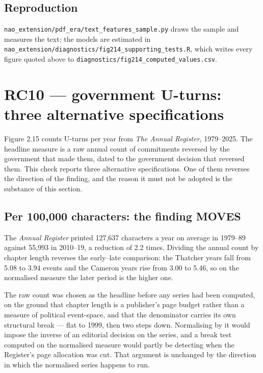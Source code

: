 \subsection*{Reproduction}

\texttt{nao\_extension/pdf\_era/text\_features\_sample.py} draws the sample and measures the
text; the models are estimated in
\texttt{nao\_extension/diagnostics/fig214\_supporting\_tests.R}, which writes every figure quoted
above to \texttt{diagnostics/fig214\_computed\_values.csv}.



\section{RC10 --- government U-turns: three alternative specifications}

Figure 2.15 counts U-turns per year from \emph{The Annual Register}, 1979--2025. The headline
measure is a raw annual count of commitments reversed by the government that made them, dated to
the government decision that reversed them. This check reports three alternative specifications.
One of them reverses the direction of the finding, and the reason it must not be adopted is the
substance of this section.



\subsection*{Per 100,000 characters: the finding MOVES}

The \emph{Annual Register} printed 127,637 characters a year on average in 1979--89 against 55,993
in 2010--19, a reduction of 2.2 times. Dividing the annual count by chapter length reverses the
early--late comparison: the Thatcher years fall from 5.08 to 3.94 events and the Cameron years rise
from 3.00 to 5.46, so on the normalised measure the later period is the higher one.

The raw count was chosen as the headline before any series had been computed, on the ground that
chapter length is a publisher's page budget rather than a measure of political event-space, and
that the denominator carries its own structural break --- flat to 1999, then two steps down.
Normalising by it would impose the inverse of an editorial decision on the series, and a break test
computed on the normalised measure would partly be detecting when the Register's page allocation
was cut. That argument is unchanged by the direction in which the normalised series happens to run.

